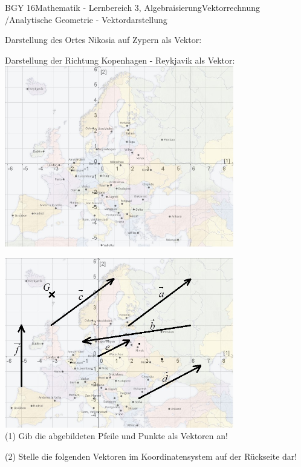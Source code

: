 \documentclass[oneside,openany,headings=optiontotoc,11pt,numbers=noenddot]{scrreprt}
\begin{document}
	\begin{worksheet}{BGY 16}{Mathematik - Lernbereich 3, Algebraisierung}{Vektorrechnung /Analytische Geometrie - Vektordarstellung}
				
		\noindent
		\begin{framed}
			\noindent
			Darstellung des Ortes \glqq{}Nikosia\grqq{} auf Zypern als Vektor:\\
			\par
			\bigskip
			\noindent
			Darstellung der Richtung \glqq{}Kopenhagen - Reykjavik\grqq{} als Vektor:\\
			\includegraphics[width=0.75\textwidth]{MapKoord.jpg}			
		\end{framed}
		\begin{framed}
			\noindent
			\includegraphics[width=0.75\textwidth]{MapVec.jpg}\\
			(1) Gib die abgebildeten Pfeile und Punkte als Vektoren an!\\
			\par
			\bigskip
			\noindent
			(2) Stelle die folgenden Vektoren im Koordinatensystem auf der Rückseite dar!\\

\end{framed}
\end{worksheet}
\end{document}
